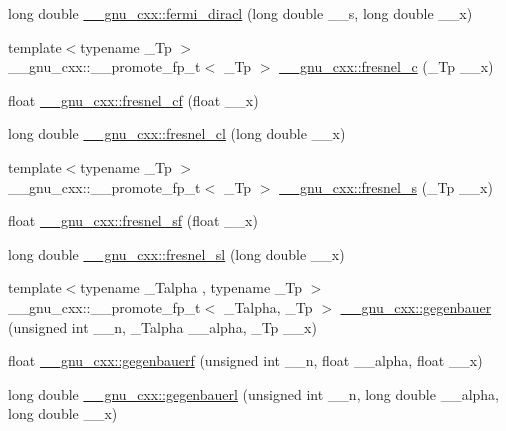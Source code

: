 \begin{DoxyCompactItemize}
long double \hyperlink{group__gnu__math__spec__func_ga3876af54a92853036cc88ec6b8ea5d67}{\+\_\+\+\_\+gnu\+\_\+cxx\+::fermi\+\_\+diracl} (long double \+\_\+\+\_\+s, long double \+\_\+\+\_\+x)
\item 
{\footnotesize template$<$typename \+\_\+\+Tp $>$ }\\\+\_\+\+\_\+gnu\+\_\+cxx\+::\+\_\+\+\_\+promote\+\_\+fp\+\_\+t$<$ \+\_\+\+Tp $>$ \hyperlink{group__gnu__math__spec__func_gab6a34ce43bad4e8181ad9c40aebb9ada}{\+\_\+\+\_\+gnu\+\_\+cxx\+::fresnel\+\_\+c} (\+\_\+\+Tp \+\_\+\+\_\+x)
\item 
float \hyperlink{group__gnu__math__spec__func_ga02ca7579d5aef96cba69e38e988e7a42}{\+\_\+\+\_\+gnu\+\_\+cxx\+::fresnel\+\_\+cf} (float \+\_\+\+\_\+x)
\item 
long double \hyperlink{group__gnu__math__spec__func_gaa3f82a7569d61c2f7c194d2e64b616f8}{\+\_\+\+\_\+gnu\+\_\+cxx\+::fresnel\+\_\+cl} (long double \+\_\+\+\_\+x)
\item 
{\footnotesize template$<$typename \+\_\+\+Tp $>$ }\\\+\_\+\+\_\+gnu\+\_\+cxx\+::\+\_\+\+\_\+promote\+\_\+fp\+\_\+t$<$ \+\_\+\+Tp $>$ \hyperlink{group__gnu__math__spec__func_gaaf6e2b182d0abde6fde72c0b8b9f959c}{\+\_\+\+\_\+gnu\+\_\+cxx\+::fresnel\+\_\+s} (\+\_\+\+Tp \+\_\+\+\_\+x)
\item 
float \hyperlink{group__gnu__math__spec__func_ga73450b8fd4abd5d8d3191dd6cbcda808}{\+\_\+\+\_\+gnu\+\_\+cxx\+::fresnel\+\_\+sf} (float \+\_\+\+\_\+x)
\item 
long double \hyperlink{group__gnu__math__spec__func_ga5d6ac976fa316df9b943f92bafe1407d}{\+\_\+\+\_\+gnu\+\_\+cxx\+::fresnel\+\_\+sl} (long double \+\_\+\+\_\+x)
\item 
{\footnotesize template$<$typename \+\_\+\+Talpha , typename \+\_\+\+Tp $>$ }\\\+\_\+\+\_\+gnu\+\_\+cxx\+::\+\_\+\+\_\+promote\+\_\+fp\+\_\+t$<$ \+\_\+\+Talpha, \+\_\+\+Tp $>$ \hyperlink{group__gnu__math__spec__func_ga793df814fb4e1b60e926ead0be14cc87}{\+\_\+\+\_\+gnu\+\_\+cxx\+::gegenbauer} (unsigned int \+\_\+\+\_\+n, \+\_\+\+Talpha \+\_\+\+\_\+alpha, \+\_\+\+Tp \+\_\+\+\_\+x)
\item 
float \hyperlink{group__gnu__math__spec__func_ga0f16dd9c771c8c177f377381b6e3387c}{\+\_\+\+\_\+gnu\+\_\+cxx\+::gegenbauerf} (unsigned int \+\_\+\+\_\+n, float \+\_\+\+\_\+alpha, float \+\_\+\+\_\+x)
\item 
long double \hyperlink{group__gnu__math__spec__func_gabf1644841deefbb162ade9fa508591cb}{\+\_\+\+\_\+gnu\+\_\+cxx\+::gegenbauerl} (unsigned int \+\_\+\+\_\+n, long double \+\_\+\+\_\+alpha, long double \+\_\+\+\_\+x)

\end{DoxyCompactItemize}
